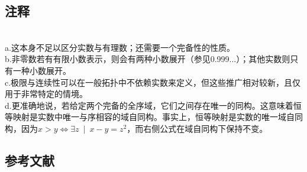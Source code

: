 \subsection{注释}\\
a.这本身不足以区分实数与有理数；还需要一个完备性的性质。\\
b.非零数若有有限小数表示，则会有两种小数展开（参见0.999...）；其他实数则只有一种小数展开。\\
c.极限与连续性可以在一般拓扑中不依赖实数来定义，但这些推广相对较新，且仅用于非常特定的情境。\\
d.更准确地说，若给定两个完备的全序域，它们之间存在唯一的同构。这意味着恒等映射是实数中唯一与序相容的域自同构。事实上，恒等映射是实数的唯一域自同构，因为$x>y \iff \exists z \ \mid \ x-y=z^{2}$，而右侧公式在域自同构下保持不变。
\subsection{参考文献}
